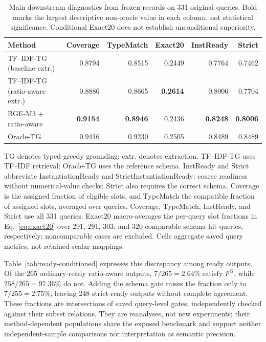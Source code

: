 \documentclass[pdflatex,iicol,sn-basic,Numbered]{sn-jnl}
\begin{document}
\begin{table}[t]
  \centering
  \caption{Main downstream diagnostics from frozen records on 331 original queries. Bold marks the largest descriptive non-oracle value in each column, not statistical significance. Conditional Exact20 does not establish unconditional superiority.}
  \label{tab:nlp4lp-downstream-main}
  \small
  \setlength{\tabcolsep}{3.2pt}
  \renewcommand{\arraystretch}{1.12}
  \begin{tabular}{@{}lrrrrr@{}}
    \toprule
    Method & Coverage & TypeMatch & Exact20 & InstReady & Strict \\
    \midrule
TF--IDF-TG (baseline extr.) & 0.8794 & 0.8515 & 0.2449 & 0.7764 & 0.7462 \\
TF--IDF-TG (ratio-aware extr.) & 0.8886 & 0.8665 & \textbf{0.2614} & 0.8006 & 0.7704 \\
BGE-M3 + ratio-aware & \textbf{0.9154} & \textbf{0.8946} & 0.2436 & \textbf{0.8248} & \textbf{0.8006} \\
Oracle-TG & 0.9416 & 0.9230 & 0.2505 & 0.8489 & 0.8489 \\
    \bottomrule
  \end{tabular}

  \vspace{2mm}
  \begin{minipage}{\textwidth}
  \small\raggedright
  TG denotes typed-greedy grounding; extr. denotes extraction. TF--IDF-TG uses TF--IDF retrieval; Oracle-TG uses the reference schema. InstReady and Strict abbreviate InstantiationReady and StrictInstantiationReady: coarse readiness without numerical-value checks; Strict also requires the correct schema. Coverage is the assigned fraction of eligible slots, and TypeMatch the compatible fraction of assigned slots, averaged over queries. Coverage, TypeMatch, InstReady, and Strict use all 331 queries. Exact20 macro-averages the per-query slot fractions in Eq.~\eqref{eq:exact20} over 291, 291, 303, and 320 comparable schema-hit queries, respectively; noncomparable cases are excluded. Cells aggregate saved query metrics, not retained scalar mappings.
  \end{minipage}
\end{table}

Table~\ref{tab:ready-conditioned} expresses this discrepancy among ready outputs. Of the 265 ordinary-ready ratio-aware outputs, $7/265=2.64\%$ satisfy $F^G$, while $258/265=97.36\%$ do not. Adding the schema gate raises the fraction only to $7/255=2.75\%$, leaving 248 strict-ready outputs without complete agreement. These fractions are intersections of saved query-level gates, independently checked against their subset relations. They are reanalyses, not new experiments; their method-dependent populations share the exposed benchmark and support neither independent-sample comparisons nor interpretation as semantic precision.
\end{document}
